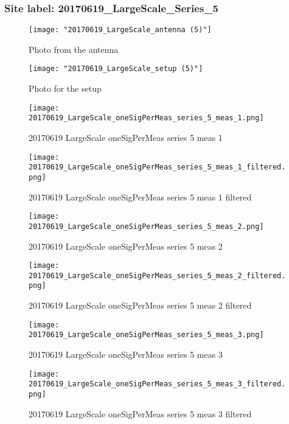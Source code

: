 \subsubsection{Site label: 20170619\_LargeScale\_Series\_5}
\begin{figure}[ht] \caption{Photo from the antenna}
\texttt{[image: "20170619\_LargeScale\_antenna (5)"]}\centering\end{figure}
\begin{figure}[ht] \caption{Photo for the setup}
\texttt{[image: "20170619\_LargeScale\_setup (5)"]}\centering\end{figure}
\begin{figure}[ht] \caption{20170619 LargeScale oneSigPerMeas series 5 meas 1}
\texttt{[image: 20170619\_LargeScale\_oneSigPerMeas\_series\_5\_meas\_1.png]}\centering\end{figure}
\begin{figure}[ht] \caption{20170619 LargeScale oneSigPerMeas series 5 meas 1 filtered}
\texttt{[image: 20170619\_LargeScale\_oneSigPerMeas\_series\_5\_meas\_1\_filtered.png]}\centering\end{figure}
\begin{figure}[ht] \caption{20170619 LargeScale oneSigPerMeas series 5 meas 2}
\texttt{[image: 20170619\_LargeScale\_oneSigPerMeas\_series\_5\_meas\_2.png]}\centering\end{figure}
\begin{figure}[ht] \caption{20170619 LargeScale oneSigPerMeas series 5 meas 2 filtered}
\texttt{[image: 20170619\_LargeScale\_oneSigPerMeas\_series\_5\_meas\_2\_filtered.png]}\centering\end{figure}
\begin{figure}[ht] \caption{20170619 LargeScale oneSigPerMeas series 5 meas 3}
\texttt{[image: 20170619\_LargeScale\_oneSigPerMeas\_series\_5\_meas\_3.png]}\centering\end{figure}
\begin{figure}[ht] \caption{20170619 LargeScale oneSigPerMeas series 5 meas 3 filtered}
\texttt{[image: 20170619\_LargeScale\_oneSigPerMeas\_series\_5\_meas\_3\_filtered.png]}\centering\end{figure}
\clearpage
